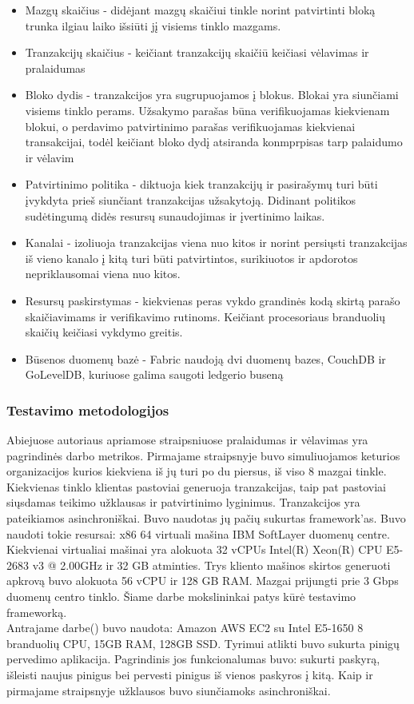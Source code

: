 \documentclass{VUMIFPSkursinis}
\begin{document}
			\begin{itemize}
				\item{Mazgų skaičius - didėjant mazgų skaičiui tinkle norint patvirtinti bloką trunka ilgiau laiko išsiūti jį visiems tinklo mazgams.}
				\item{Tranzakcijų skaičius - keičiant tranzakcijų skaičiū keičiasi vėlavimas ir pralaidumas}
				\item{Bloko dydis - tranzakcijos yra sugrupuojamos į blokus. Blokai yra siunčiami visiems tinklo perams. Užsakymo parašas 
būna verifikuojamas kiekvienam blokui, o perdavimo patvirtinimo parašas verifikuojamas kiekvienai transakcijai, todėl keičiant bloko dydį atsiranda konmprpisas tarp palaidumo ir vėlavim}
				\item{Patvirtinimo politika - diktuoja kiek tranzakcijų ir pasirašymų turi būti įvykdyta prieš siunčiant tranzakcijas užsakytoją. Didinant politikos sudėtingumą didės resursų sunaudojimas ir įvertinimo laikas.}
				\item{Kanalai - izoliuoja tranzakcijas viena nuo kitos ir norint persiųsti tranzakcijas iš vieno kanalo į kitą turi būti patvirtintos, surikiuotos ir apdorotos nepriklausomai viena nuo kitos.}
				\item{Resursų paskirstymas - kiekvienas peras vykdo grandinės kodą skirtą parašo skaičiavimams ir verifikavimo rutinoms. Keičiant procesoriaus branduolių skaičių keičiasi vykdymo greitis.}
				\item{Būsenos duomenų bazė - Fabric naudoją dvi duomenų bazes, CouchDB ir GoLevelDB, kuriuose galima saugoti ledgerio buseną}
			\end{itemize}

		\subsubsection{Testavimo metodologijos}
			Abiejuose autoriaus apriamose straipsniuose pralaidumas ir vėlavimas yra pagrindinės darbo metrikos. Pirmajame straipsnyje \cite{IMBResearch}  buvo simuliuojamos keturios organizacijos kurios kiekviena iš jų turi po du piersus, iš viso 8 mazgai tinkle. Kiekvienas tinklo klientas pastoviai generuoja tranzakcijas, taip pat pastoviai siųsdamas teikimo užklausas ir patvirtinimo lyginimus. Tranzakcijos yra pateikiamos asinchroniškai. Buvo naudotas jų pačių sukurtas framework'as. Buvo naudoti tokie resursai: x86 64 virtuali mašina IBM SoftLayer duomenų centre. Kiekvienai virtualiai mašinai yra alokuota 32 vCPUs  Intel(R) Xeon(R)
CPU E5-2683 v3 @ 2.00GHz ir 32 GB atminties.  Trys kliento mašinos skirtos generuoti apkrovą buvo alokuota
 56 vCPU ir 128 GB RAM. Mazgai prijungti prie 3 Gbps duomenų centro tinklo. Šiame darbe mokslininkai patys kūrė testavimo frameworką. \\
Antrajame darbe(\cite{ThailandPerf}) buvo naudota: Amazon AWS EC2
 su Intel E5-1650 8 branduolių CPU,
15GB RAM, 128GB SSD. Tyrimui atlikti buvo sukurta pinigų pervedimo aplikacija. Pagrindinis jos funkcionalumas buvo: sukurti paskyrą, išleisti naujus pinigus bei pervesti pinigus iš vienos paskyros į kitą. Kaip ir pirmajame straipsnyje užklausos buvo siunčiamoks asinchroniškai.
 
\end{document}
